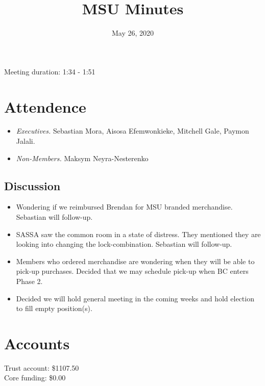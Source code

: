 \documentclass[12pt]{article}
\title{MSU Minutes}
\date{May 26, 2020}
\begin{document}
\maketitle

Meeting duration: 1:34 - 1:51

\section*{Attendence}
\begin{itemize}
\item \textit{Executives.} Sebastian Mora, Aisosa Efemwonkieke, Mitchell Gale, Paymon Jalali.
\item \textit{Non-Members.} Maksym Neyra-Nesterenko
\end{itemize}

\subsection*{Discussion}
\begin{itemize}
\item Wondering if we reimbursed Brendan for MSU branded merchandise. Sebastian will follow-up.
\item SASSA saw the common room in a state of distress. They mentioned they are looking into changing the lock-combination. Sebastian will follow-up.
\item Members who ordered merchandise are wondering when they will be able to pick-up purchases. Decided that we may schedule pick-up when BC enters Phase 2.
\item Decided we will hold general meeting in the coming weeks and hold election to fill empty position(s).
\end{itemize}

\section*{Accounts}
Trust account: \$1107.50 \\
Core funding: \$0.00 \\
\end{document}
